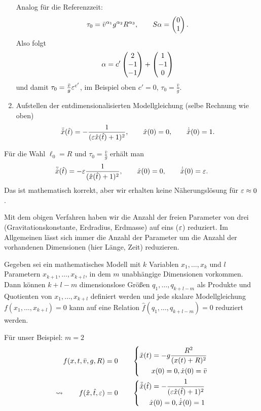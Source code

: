 \begin{enumerate}
  Analog für die Referenzzeit:
  \[ \tau_0 = \bar{v}^{\alpha_1} g^{\alpha_2} R^{\alpha_3}, \qquad S \alpha =
    \begin{pmatrix}0 \\ 1\end{pmatrix}. \]
  Also folgt
  \[ \alpha = c' \begin{pmatrix}2 \\ -1 \\ -1\end{pmatrix} + \begin{pmatrix}1 \\ -1 \\ 0 \end{pmatrix} \]
  und damit $\tau_0 = \frac{\bar{v}}{g} \varepsilon^{c'}$, im Beispiel oben $c' = 0$,
  $\tau_0 = \frac{\bar{v}}{g}$.
\item Aufstellen der entdimensionalisierten Modellgleichung (selbe Rechnung wie
  oben)
  \[ \ddot{\hat{x}}( \hat{t} ) = -\frac{1}{(\varepsilon \hat{x}(\hat{t}) + 1)^2}, \qquad
    \hat{x}(0) = 0, \qquad \dot{\hat{x}}(0) = 1. \]
\end{enumerate}

\begin{rmrk*}
  Für die Wahl $\ell_0 = R$ und $\tau_0 = \frac{\bar{v}}{g}$ erhält man
  \[ \ddot{\hat{x}}(\hat{t}) = - \varepsilon \frac{1}{(\hat{x}(\hat{t}) + 1)^2}, \qquad
    \hat{x}(0) = 0, \qquad \dot{\hat{x}}(0) = \varepsilon. \]
  Das ist mathematisch korrekt, aber wir erhalten keine Näherungslösung für
  $\varepsilon \approx 0$.
\end{rmrk*}

Mit dem obigen Verfahren haben wir die Anzahl der freien Parameter von drei
(Gravitationskonstante, Erdradius, Erdmasse) auf eins ($\varepsilon$) reduziert. Im
Allgemeinen lässt sich immer die Anzahl der Parameter um die Anzahl der
vorhandenen Dimensionen (hier Länge, Zeit) reduzieren.

\begin{thm}
  Gegeben sei ein mathematisches Modell mit $k$ Variablen $x_1, \ldots, x_k$ und
  $l$ Parametern $x_{k+1}, \ldots, x_{k+l}$, in dem $m$ unabhängige Dimensionen
  vorkommen. Dann können $k + l - m$ dimensionslose Größen $q_1, \ldots,
  q_{k+l-m}$ als Produkte und Quotienten von $x_1, \ldots, x_{k+l}$ definiert
  werden und jede skalare Modellgleichung $f(x_1, \ldots, x_{k+l}) = 0$ kann auf
  eine Relation $\hat{f}( q_1, \ldots, q_{k+l-m} ) = 0$ reduziert werden.
\end{thm}

Für unser Beispiel: $m = 2$
\begin{align*}
  f( x, t, \bar{v}, g, R) = 0 \qquad
  &\left\{ \begin{aligned}
      \ddot{x}(t) = -g \frac{R^2}{(x(t) + R)^2} \\
      x(0) = 0, \dot{x}(0) = \bar{v}
    \end{aligned}
  \right. \\ 
  \rightsquigarrow \qquad
  f( \hat{x}, \hat{t}, \varepsilon) = 0 \qquad
  &\left\{ \begin{aligned}
      \ddot{\hat{x}}(\hat{t}) = - \frac{1}{(\varepsilon \hat{x}(\hat{t}) + 1)^2} \\
      \hat{x}(0) = 0, \dot{\hat{x}}(0) = 1
    \end{aligned}
  \right.
\end{align*}

